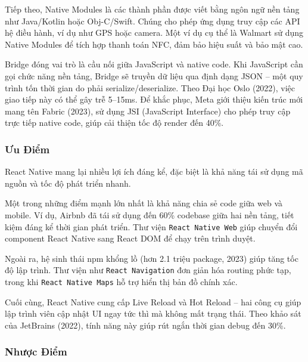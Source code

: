 \begin{sloppypar}
Tiếp theo, Native Modules là các thành phần được viết bằng ngôn ngữ nền tảng như Java/Kotlin hoặc Obj-C/Swift.  
Chúng cho phép ứng dụng truy cập các API hệ điều hành, ví dụ như GPS hoặc camera.  
Một ví dụ cụ thể là Walmart sử dụng Native Modules để tích hợp thanh toán NFC, đảm bảo hiệu suất và bảo mật cao.
\end{sloppypar}

\begin{sloppypar}
Bridge đóng vai trò là cầu nối giữa JavaScript và native code.  
Khi JavaScript cần gọi chức năng nền tảng, Bridge sẽ truyền dữ liệu qua định dạng JSON – một quy trình tốn thời gian do phải serialize/\-deserialize.  
Theo Đại học Oslo (2022), việc giao tiếp này có thể gây trễ 5–15ms.  
Để khắc phục, Meta giới thiệu kiến trúc mới mang tên Fabric (2023), sử dụng JSI (JavaScript\- Interface) cho phép truy cập trực tiếp native code, giúp cải thiện tốc độ render đến 40\%.
\end{sloppypar}

\subsubsection{Ưu Điểm}
\hspace*{1.5em}React Native mang lại nhiều lợi ích đáng kể, đặc biệt là khả năng tái sử dụng mã nguồn và tốc độ phát triển nhanh.

Một trong những điểm mạnh lớn nhất là khả năng chia sẻ code giữa web và mobile.  
Ví dụ, Airbnb đã tái sử dụng đến 60\% codebase giữa hai nền tảng, tiết kiệm đáng kể thời gian phát triển.  
Thư viện \texttt{React Native Web} giúp chuyển đổi component React Native sang React DOM để chạy trên trình duyệt.

Ngoài ra, hệ sinh thái npm khổng lồ (hơn 2.1 triệu package, 2023) giúp tăng tốc độ lập trình.  
Thư viện như \texttt{React Navigation} đơn giản hóa routing phức tạp, trong khi \texttt{React Native Maps} hỗ trợ hiển thị bản đồ chính xác.

Cuối cùng, React Native cung cấp Live Reload và Hot Reload – hai công cụ giúp lập trình viên cập nhật UI ngay tức thì mà không mất trạng thái.  
Theo khảo sát của JetBrains (2022), tính năng này giúp rút ngắn thời gian debug đến 30\%.

\subsubsection{Nhược Điểm}

